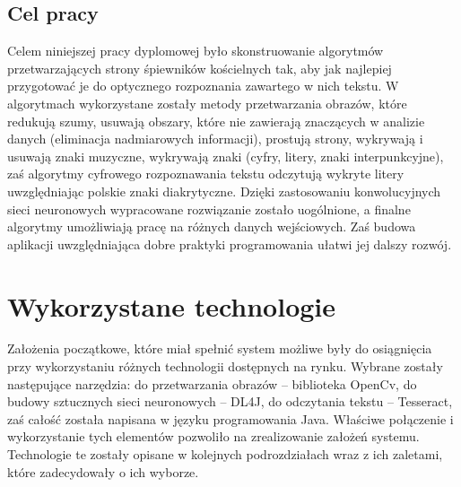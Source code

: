 \documentclass[a4paper,12pt]{article}
\newcommand\spacingIndent{2.2em}
\begin{document}
\begin{minipage}[s]{\textwidth}
		\subsection{Cel pracy}
			\hspace{\spacingIndent} Celem niniejszej pracy dyplomowej było skonstruowanie algorytmów przetwarzających strony śpiewników kościelnych tak, 
				aby jak najlepiej przygotować je do optycznego rozpoznania zawartego w nich tekstu. W algorytmach wykorzystane zostały metody przetwarzania obrazów, 
				które redukują szumy, usuwają obszary, które nie zawierają znaczących w analizie danych (eliminacja nadmiarowych informacji), 
				prostują strony, wykrywają i usuwają znaki muzyczne, wykrywają znaki (cyfry, litery, znaki interpunkcyjne), 
				zaś algorytmy cyfrowego rozpoznawania tekstu odczytują wykryte litery uwzględniając polskie znaki diakrytyczne. 
				Dzięki zastosowaniu konwolucyjnych sieci neuronowych wypracowane rozwiązanie zostało uogólnione, a \nopagebreak finalne algorytmy umożliwiają pracę 
				na różnych danych wejściowych. Zaś budowa aplikacji uwzględniająca dobre praktyki programowania ułatwi jej dalszy rozwój.
				
		\end{minipage}
				
	\newpage 

	\section{Wykorzystane technologie}
	    \hspace{\spacingIndent} Założenia początkowe, które miał spełnić system możliwe były do osiągnięcia przy wykorzystaniu różnych technologii dostępnych na rynku. Wybrane zostały następujące narzędzia: do przetwarzania obrazów -- biblioteka OpenCv, do budowy sztucznych sieci neuronowych -- DL4J, do odczytania tekstu -- Tesseract, zaś całość została napisana w języku programowania Java. Właściwe połączenie i wykorzystanie tych elementów pozwoliło na zrealizowanie założeń systemu. Technologie te zostały opisane w kolejnych podrozdziałach wraz z ich zaletami, które zadecydowały o ich wyborze.
	    
	    
	    
\end{document}
